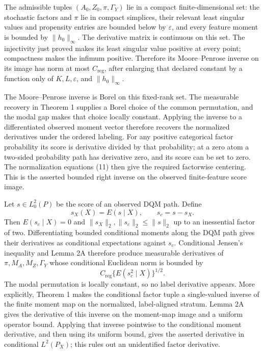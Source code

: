 The admissible tuples \((A_0,Z_0,\pi,\Gamma_Y)\) lie in a compact finite-dimensional set: the stochastic factors and \(\pi\) lie in compact simplices, their relevant least singular values and propensity entries are bounded below by \(\varepsilon\), and every feature moment is bounded by \(\|h_0\|_\infty\).  The derivative matrix is continuous on this set.  The injectivity just proved makes its least singular value positive at every point; compactness makes the infimum positive.  Therefore its Moore--Penrose inverse on its image has norm at most \(C_{\mathrm{reg}}\), after enlarging that declared constant by a function only of \(K,L,\varepsilon\), and \(\|h_0\|_\infty\).

The Moore--Penrose inverse is Borel on this fixed-rank set.  The measurable recovery in Theorem 1 supplies a Borel choice of the common permutation, and the modal gap makes that choice locally constant.  Applying the inverse to a differentiated observed moment vector therefore recovers the normalized derivatives under the ordered labeling.  For any positive categorical factor probability its score is derivative divided by that probability; at a zero atom a two-sided probability path has derivative zero, and its score can be set to zero.  The normalization equations (11) then give the required factorwise centering.  This is the asserted bounded right inverse on the observed finite-feature score image.

Let \(s\in L^2_0(P)\) be the score of an observed DQM path.  Define
\[
s_X(X)=E(s\mid X),\qquad s_c=s-s_X. \tag{14}
\]
Then \(E(s_c\mid X)=0\) and \(\|s_X\|_2,\|s_c\|_2\leq\|s\|_2\) up to an inessential factor of two.  Differentiating bounded conditional moments along the DQM path gives their derivatives as conditional expectations against \(s_c\).  Conditional Jensen's inequality and Lemma 2A therefore produce measurable derivatives of \(\pi,M_A,M_Z,\Gamma_Y\) whose conditional Euclidean norm is bounded by
\[
C_{\mathrm{reg}}\{E(s_c^2\mid X)\}^{1/2}. \tag{15}
\]
The modal permutation is locally constant, so no label derivative appears.  More explicitly, Theorem 1 makes the conditional factor tuple a single-valued inverse of the finite moment map on the normalized, label-aligned stratum.  Lemma 2A gives the derivative of this inverse on the moment-map image and a uniform operator bound.  Applying that inverse pointwise to the conditional moment derivative, and then using its uniform bound, gives the asserted derivative in conditional \(L^2(P_X)\); this rules out an unidentified factor derivative.

